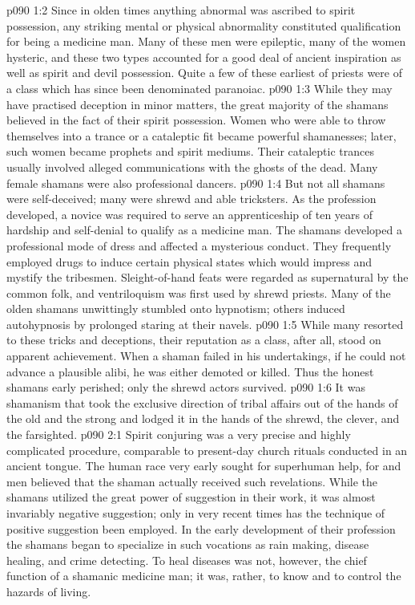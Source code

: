 \vs p090 1:2 Since in olden times anything abnormal was ascribed to spirit possession, any striking mental or physical abnormality constituted qualification for being a medicine man. Many of these men were epileptic, many of the women hysteric, and these two types accounted for a good deal of ancient inspiration as well as spirit and devil possession. Quite a few of these earliest of priests were of a class which has since been denominated paranoiac.
\vs p090 1:3 While they may have practised deception in minor matters, the great majority of the shamans believed in the fact of their spirit possession. Women who were able to throw themselves into a trance or a cataleptic fit became powerful shamanesses; later, such women became prophets and spirit mediums. Their cataleptic trances usually involved alleged communications with the ghosts of the dead. Many female shamans were also professional dancers.
\vs p090 1:4 But not all shamans were self\hyp{}deceived; many were shrewd and able tricksters. As the profession developed, a novice was required to serve an apprenticeship of ten years of hardship and self\hyp{}denial to qualify as a medicine man. The shamans developed a professional mode of dress and affected a mysterious conduct. They frequently employed drugs to induce certain physical states which would impress and mystify the tribesmen. Sleight\hyp{}of\hyp{}hand feats were regarded as supernatural by the common folk, and ventriloquism was first used by shrewd priests. Many of the olden shamans unwittingly stumbled onto hypnotism; others induced autohypnosis by prolonged staring at their navels.
\vs p090 1:5 While many resorted to these tricks and deceptions, their reputation as a class, after all, stood on apparent achievement. When a shaman failed in his undertakings, if he could not advance a plausible alibi, he was either demoted or killed. Thus the honest shamans early perished; only the shrewd actors survived.
\vs p090 1:6 It was shamanism that took the exclusive direction of tribal affairs out of the hands of the old and the strong and lodged it in the hands of the shrewd, the clever, and the farsighted.
\vs p090 2:1 Spirit conjuring was a very precise and highly complicated procedure, comparable to present\hyp{}day church rituals conducted in an ancient tongue. The human race very early sought for superhuman help, for  and men believed that the shaman actually received such revelations. While the shamans utilized the great power of suggestion in their work, it was almost invariably negative suggestion; only in very recent times has the technique of positive suggestion been employed. In the early development of their profession the shamans began to specialize in such vocations as rain making, disease healing, and crime detecting. To heal diseases was not, however, the chief function of a shamanic medicine man; it was, rather, to know and to control the hazards of living.
